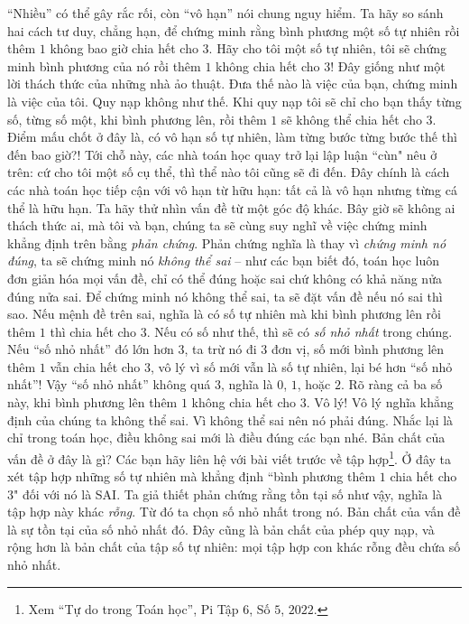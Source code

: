 \begin{multicols}{2}
	``Nhiều'' có thể gây rắc rối, còn ``vô hạn'' nói chung nguy hiểm. Ta hãy so sánh hai cách tư duy, chẳng hạn, để chứng minh rằng bình phương một số tự nhiên rồi thêm $1$ không bao giờ chia hết cho $3$.
	\vskip 0.1cm
	Hãy cho tôi một số tự nhiên, tôi sẽ chứng minh bình phương của nó rồi thêm $1$ không chia hết cho $3$!
	\vskip 0.1cm
	Đây giống như một lời thách thức của những nhà ảo thuật. Đưa thế nào là việc của bạn, chứng minh là việc của tôi.
	\vskip 0.1cm
	Quy nạp không như thế. Khi quy nạp tôi sẽ chỉ cho bạn thấy từng số, từng số một, khi bình phương lên, rồi thêm $1$ sẽ không thể chia hết cho $3$. 
	\vskip 0.1cm
	Điểm mấu chốt ở đây là, có vô hạn số tự nhiên, làm từng bước từng bước thế thì đến bao giờ?! Tới chỗ này, các nhà toán học quay trở lại lập luận ``cùn" nêu ở trên: cứ cho tôi một số cụ thể, thì thể nào tôi cũng sẽ đi đến. 
	\vskip 0.1cm
	Đây chính là cách các nhà toán học tiếp cận với vô hạn từ hữu hạn: tất cả là vô hạn nhưng từng cá thể là hữu hạn. 
	\vskip 0.1cm
	Ta hãy thử nhìn vấn đề từ một góc độ khác. Bây giờ sẽ không ai thách thức ai, mà tôi và bạn, chúng ta sẽ cùng suy nghĩ về việc chứng minh khẳng định trên bằng {\em phản chứng}. Phản chứng nghĩa là thay vì {\em chứng minh nó đúng}, ta sẽ chứng minh nó {\em không thể sai} -- như các bạn biết đó, toán học luôn đơn giản hóa mọi vấn đề, chỉ có thể đúng hoặc sai chứ không có khả năng nửa đúng nửa sai. 
	\vskip 0.1cm
	Để chứng minh nó không thể sai, ta sẽ đặt vấn đề nếu nó sai thì sao. Nếu mệnh đề trên sai, nghĩa là có số tự nhiên mà khi bình phương lên rồi thêm $1$ thì chia hết cho $3$.
	\vskip 0.1cm 
	Nếu có số như thế, thì sẽ có {\em số nhỏ nhất} trong chúng. Nếu ``số nhỏ nhất'' đó lớn hơn $3$, ta trừ nó đi $3$ đơn vị, số mới bình phương lên thêm $1$ vẫn chia hết cho $3$, vô lý vì số mới vẫn là số tự nhiên, lại bé hơn ``số nhỏ nhất''! Vậy ``số nhỏ nhất'' không quá $3$, nghĩa là $0$, $1$, hoặc $2$. Rõ ràng cả ba số này, khi bình phương lên thêm $1$ không chia hết cho $3$. Vô lý!
	\vskip 0.1cm
	Vô lý nghĩa khẳng định của chúng ta không thể sai. Vì không thể sai nên nó phải đúng. Nhắc lại là chỉ trong toán học, điều không sai mới là điều đúng các bạn nhé.
	\vskip 0.1cm
	Bản chất của vấn đề ở đây là gì? Các bạn hãy liên hệ với bài viết trước về tập hợp\footnote[2]{\color{quantoan}Xem ``Tự do trong Toán học'', Pi  Tập $6$, Số $5$, $2022$.}. Ở đây ta xét tập hợp những số tự nhiên mà khẳng định ``bình phương thêm $1$ chia hết cho $3$" đối với nó là SAI. Ta giả thiết phản chứng rằng tồn tại số như vậy, nghĩa là tập hợp này khác {\em rỗng}. Từ đó ta chọn số nhỏ nhất trong nó. Bản chất của vấn đề là sự tồn tại của số nhỏ nhất đó. Đây cũng là bản chất của phép quy nạp, và rộng hơn là bản chất của tập số tự nhiên: mọi tập hợp con khác rỗng đều chứa số nhỏ nhất.  
\end{multicols}